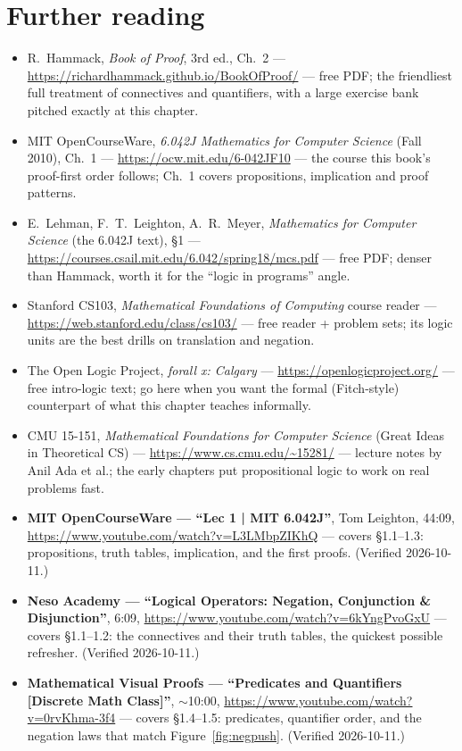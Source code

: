 \section*{Further reading}
\begin{itemize}
\item R.~Hammack, \emph{Book of Proof}, 3rd ed., Ch.~2 ---
\url{https://richardhammack.github.io/BookOfProof/} --- free PDF; the
friendliest full treatment of connectives and quantifiers, with a large
exercise bank pitched exactly at this chapter.
\item MIT OpenCourseWare, \emph{6.042J Mathematics for Computer Science}
(Fall 2010), Ch.~1 --- \url{https://ocw.mit.edu/6-042JF10} ---
the course this book's proof-first order follows; Ch.~1 covers
propositions, implication and proof patterns.
\item E.~Lehman, F.~T.~Leighton, A.~R.~Meyer, \emph{Mathematics for Computer
Science} (the 6.042J text), \S1 ---
\url{https://courses.csail.mit.edu/6.042/spring18/mcs.pdf} --- free PDF;
denser than Hammack, worth it for the ``logic in programs'' angle.
\item Stanford CS103, \emph{Mathematical Foundations of Computing} course
reader ---
\url{https://web.stanford.edu/class/cs103/} --- free reader + problem sets;
its logic units are the best drills on translation and negation.
\item The Open Logic Project, \emph{forall x: Calgary} ---
\url{https://openlogicproject.org/} --- free intro-logic text; go here when
you want the formal (Fitch-style) counterpart of what this chapter teaches
informally.
\item CMU 15-151, \emph{Mathematical Foundations for Computer Science}
(Great Ideas in Theoretical CS) ---
\url{https://www.cs.cmu.edu/~15281/} --- lecture notes by Anil Ada et al.;
the early chapters put propositional logic to work on real problems fast.
\end{itemize}

\begin{rulebox}
\begin{itemize}
\item \textbf{MIT OpenCourseWare --- ``Lec 1 | MIT 6.042J''}, Tom Leighton,
44:09, \url{https://www.youtube.com/watch?v=L3LMbpZIKhQ} --- covers
\S1.1--1.3: propositions, truth tables, implication, and the first proofs.
(Verified 2026-10-11.)
\item \textbf{Neso Academy --- ``Logical Operators: Negation, Conjunction \&
Disjunction''}, 6:09,
\url{https://www.youtube.com/watch?v=6kYngPvoGxU} --- covers \S1.1--1.2: the
connectives and their truth tables, the quickest possible refresher.
(Verified 2026-10-11.)
\item \textbf{Mathematical Visual Proofs --- ``Predicates and Quantifiers
[Discrete Math Class]''}, $\sim$10:00,
\url{https://www.youtube.com/watch?v=0rvKhma-3f4} --- covers \S1.4--1.5:
predicates, quantifier order, and the negation laws that match
Figure~\ref{fig:negpush}. (Verified 2026-10-11.)
\end{itemize}
\end{rulebox}

